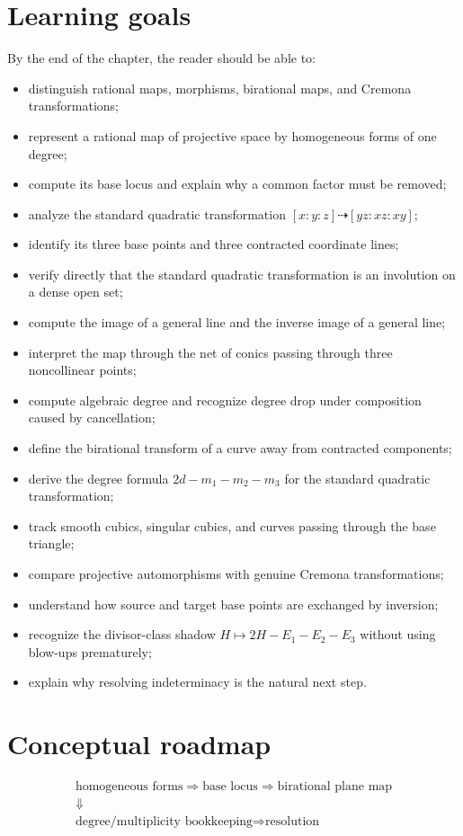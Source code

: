 \section*{Learning goals}
By the end of the chapter, the reader should be able to:
\begin{itemize}
\item distinguish rational maps, morphisms, birational maps, and Cremona transformations;
\item represent a rational map of projective space by homogeneous forms of one degree;
\item compute its base locus and explain why a common factor must be removed;
\item analyze the standard quadratic transformation \([x:y:z]\dashrightarrow[yz:xz:xy]\);
\item identify its three base points and three contracted coordinate lines;
\item verify directly that the standard quadratic transformation is an involution on a dense open set;
\item compute the image of a general line and the inverse image of a general line;
\item interpret the map through the net of conics passing through three noncollinear points;
\item compute algebraic degree and recognize degree drop under composition caused by cancellation;
\item define the birational transform of a curve away from contracted components;
\item derive the degree formula \(2d-m_1-m_2-m_3\) for the standard quadratic transformation;
\item track smooth cubics, singular cubics, and curves passing through the base triangle;
\item compare projective automorphisms with genuine Cremona transformations;
\item understand how source and target base points are exchanged by inversion;
\item recognize the divisor-class shadow \(H\mapsto2H-E_1-E_2-E_3\) without using blow-ups prematurely;
\item explain why resolving indeterminacy is the natural next step.
\end{itemize}

\section*{Conceptual roadmap}
\[
\boxed{\begin{gathered}
\text{homogeneous forms}\Longrightarrow\text{base locus}\Longrightarrow\text{birational plane map}\\
\Downarrow\\
\text{degree/multiplicity bookkeeping}\Longrightarrow\text{resolution}
\end{gathered}}
\]


